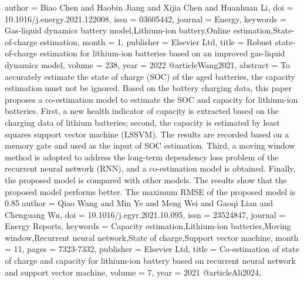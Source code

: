 {{{{   author = {Biao Chen and Haobin Jiang and Xijia Chen and Huanhuan Li},
   doi = {10.1016/j.energy.2021.122008},
   issn = {03605442},
   journal = {Energy},
   keywords = {Gas-liquid dynamics battery model,Lithium-ion battery,Online estimation,State-of-charge estimation},
   month = {1},
   publisher = {Elsevier Ltd},
   title = {Robust state-of-charge estimation for lithium-ion batteries based on an improved gas-liquid dynamics model},
   volume = {238},
   year = {2022}
}
@article{Wang2021,
   abstract = {To accurately estimate the state of charge (SOC) of the aged batteries, the capacity estimation must not be ignored. Based on the battery charging data, this paper proposes a co-estimation model to estimate the SOC and capacity for lithium-ion batteries. First, a new health indicator of capacity is extracted based on the charging data of lithium batteries; second, the capacity is estimated by least squares support vector machine (LSSVM). The results are recorded based on a memory gate and used as the input of SOC estimation. Third, a moving window method is adopted to address the long-term dependency loss problem of the recurrent neural network (RNN), and a co-estimation model is obtained. Finally, the proposed model is compared with other models. The results show that the proposed model performs better. The maximum RMSE of the proposed model is 0.85%
   author = {Qiao Wang and Min Ye and Meng Wei and Gaoqi Lian and Chenguang Wu},
   doi = {10.1016/j.egyr.2021.10.095},
   issn = {23524847},
   journal = {Energy Reports},
   keywords = {Capacity estimation,Lithium-ion batteries,Moving window,Recurrent neural network,State of charge,Support vector machine},
   month = {11},
   pages = {7323-7332},
   publisher = {Elsevier Ltd},
   title = {Co-estimation of state of charge and capacity for lithium-ion battery based on recurrent neural network and support vector machine},
   volume = {7},
   year = {2021}
}
@article{Ali2024,
}}}}}
